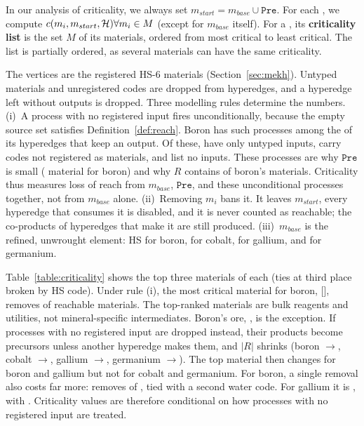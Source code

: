 In our analysis of criticality, we always set $m_{start} = m_{base} \cup \mathtt{Pre}$. For each \tool{}, we compute $c(m_i, 
m_{start}, \mathcal{H}) \forall m_i \in M$ (except for $m_{base}$ itself). For a \tool{}, its \textbf{criticality list} is the set $M$ of 
its materials, ordered from most critical to least critical. The list is partially ordered, as several materials can
have the same criticality.

The vertices are the registered HS-6 materials (Section~\ref{sec:mekh}). Untyped materials and unregistered codes are dropped from hyperedges, and a hyperedge left without outputs is dropped. Three modelling rules determine the numbers. (i)~A process with no registered input fires unconditionally, because the empty source set satisfies Definition~\ref{def:reach}. Boron has \CritSourcelessEdgesBoron{} such processes among the \CritEdgesBoron{} of its \MekhProcessesBoron{} hyperedges that keep an output. Of these, \CritSourcelessUntypedBoron{} have only untyped inputs, \CritSourcelessUnregisteredBoron{} carry codes not registered as materials, and \CritSourcelessEmptyBoron{} list no inputs. These processes are why $\mathtt{Pre}$ is small (\CritPreBoron{} material for boron) and why $R$ contains \CritReachBoron{} of boron's \CritVerticesBoron{} materials. Criticality thus measures loss of reach from $m_{base}$, $\mathtt{Pre}$, and these unconditional processes together, not from $m_{base}$ alone. (ii)~Removing $m_i$ bans it. It leaves $m_{start}$, every hyperedge that consumes it is disabled, and it is never counted as reachable; the co-products of hyperedges that make it are still produced. (iii)~$m_{base}$ is the refined, unwrought element: HS \CritBaseCodeBoron{} for boron, \CritBaseCodeCobalt{} for cobalt, \CritBaseCodeGallium{} for gallium, and \CritBaseCodeGermanium{} for germanium.

{\setlength{\tabcolsep}{3pt}\FloatFont{\footnotesize}{\CriticalityTable}}

Table~\ref{table:criticality} shows the top three materials of each \tool{} (ties at third place broken by HS code). Under rule (i), the most critical material for boron, \CritTopNameBoron{} [\CritTopCodeBoron], removes \CritTopBoron{} of \CritReachBoron{} reachable materials. The top-ranked materials are bulk reagents and utilities, not mineral-specific intermediates. Boron's ore, \CritThirdNameBoron{}, is the exception. If processes with no registered input are dropped instead, their products become precursors unless another hyperedge makes them, and $|R|$ shrinks (boron \CritReachBoron{}$\to$\CritReachNoSourcelessBoron{}, cobalt \CritReachCobalt{}$\to$\CritReachNoSourcelessCobalt{}, gallium \CritReachGallium{}$\to$\CritReachNoSourcelessGallium{}, germanium \CritReachGermanium{}$\to$\CritReachNoSourcelessGermanium{}). The top material then changes for boron and gallium but not for cobalt and germanium. For boron, a single removal also costs far more: \CritTopNameNoSourcelessBoron{} removes \CritTopNoSourcelessBoron{} of \CritReachNoSourcelessBoron{}, tied with a second water code. For gallium it is \CritTopNameNoSourcelessGallium{}, with \CritTopNoSourcelessGallium{}. Criticality values are therefore conditional on how processes with no registered input are treated.


